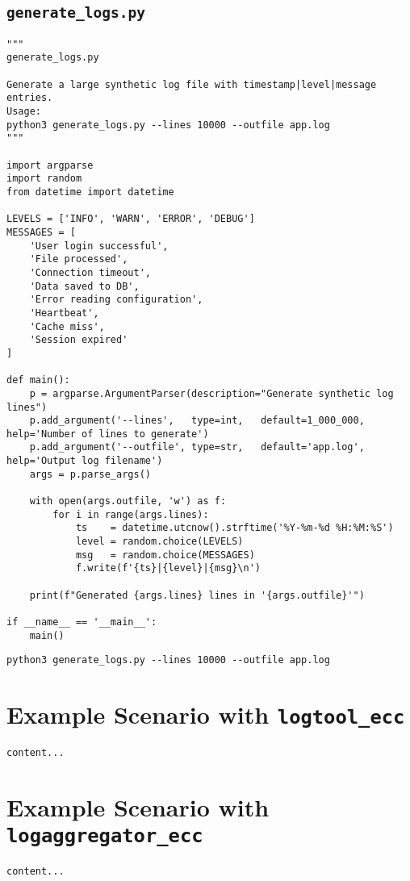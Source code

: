 \subsection*{\texttt{generate\_logs.py}}
\begin{lstlisting}[style=py]
"""
generate_logs.py

Generate a large synthetic log file with timestamp|level|message entries.
Usage:
python3 generate_logs.py --lines 10000 --outfile app.log
"""

import argparse
import random
from datetime import datetime

LEVELS = ['INFO', 'WARN', 'ERROR', 'DEBUG']
MESSAGES = [
	'User login successful',
	'File processed',
	'Connection timeout',
	'Data saved to DB',
	'Error reading configuration',
	'Heartbeat',
	'Cache miss',
	'Session expired'
]

def main():
	p = argparse.ArgumentParser(description="Generate synthetic log lines")
	p.add_argument('--lines',   type=int,   default=1_000_000, help='Number of lines to generate')
	p.add_argument('--outfile', type=str,   default='app.log', help='Output log filename')
	args = p.parse_args()
	
	with open(args.outfile, 'w') as f:
		for i in range(args.lines):
			ts    = datetime.utcnow().strftime('%Y-%m-%d %H:%M:%S')
			level = random.choice(LEVELS)
			msg   = random.choice(MESSAGES)
			f.write(f'{ts}|{level}|{msg}\n')
	
	print(f"Generated {args.lines} lines in '{args.outfile}'")

if __name__ == '__main__':
	main()

\end{lstlisting}
\begin{lstlisting}[numbers=none]
python3 generate_logs.py --lines 10000 --outfile app.log
\end{lstlisting}

\newpage
\section{Example Scenario with \texttt{logtool\_ecc}}
\begin{lstlisting}[numbers=none]
	content...
\end{lstlisting}

\section{Example Scenario with \texttt{logaggregator\_ecc}}
\begin{lstlisting}[numbers=none]
	content...
\end{lstlisting}


